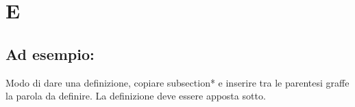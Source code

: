 \section*{E}
\markright{}
\subsection*{Ad esempio:}
Modo di dare una definizione, copiare subsection*{} e inserire tra le parentesi graffe la parola da definire. La definizione deve essere apposta sotto.